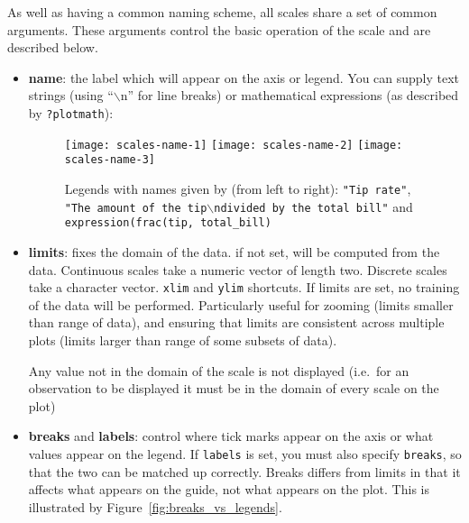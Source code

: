 As well as having a common naming scheme, all scales share a set of common arguments.  These arguments control the basic operation of the scale and are described below.

\begin{itemize}
  \item {\bf name}:  the label which will appear on the axis or legend. You can supply text strings (using ``$\backslash$n'' for line breaks) or mathematical expressions (as described by \verb|?plotmath|):
  
  \begin{figure}[htbp]
    \centering
      \texttt{[image: scales-name-1]}
      \texttt{[image: scales-name-2]}
      \texttt{[image: scales-name-3]}
    \caption{Legends with names given by (from left to right): {\tt "Tip rate"}, {\tt "The amount of the tip$\backslash$ndivided by the total bill"} and {\tt expression(frac(tip, total\_bill)} }
    \label{fig:label}
  \end{figure}
  

  \item {\bf limits}: fixes the domain of the data.  if not set, will be computed from the data.    Continuous scales take a numeric vector of length two.  Discrete scales take a character vector.  {\tt xlim} and {\tt ylim} shortcuts.  If limits are set, no training of the data will be performed.  Particularly useful for zooming (limits smaller than range of data), and ensuring that limits are consistent across multiple plots (limits larger than range of some subsets of data).  
  
  Any value not in the domain of the scale is not displayed (i.e.\ for an observation to be displayed it must be in the domain of every scale on the plot)

  \item {\bf breaks} and {\bf labels}: control where tick marks appear on the axis or what values appear on the legend.  If {\tt labels} is set, you must also specify {\tt breaks}, so that the two can be matched up correctly.  Breaks differs from limits in that it affects what appears on the guide, not what appears on the plot.  This is illustrated by Figure~\ref{fig:breaks_vs_legends}.
  
\end{itemize}

